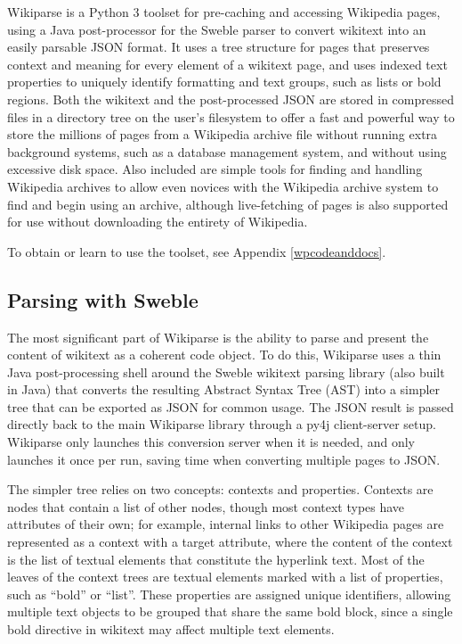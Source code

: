Wikiparse is a Python 3 toolset for pre-caching and accessing Wikipedia pages, using a Java post-processor for the Sweble\cite{sweble} parser to convert wikitext into an easily parsable JSON format. It uses a tree structure for pages that preserves context and meaning for every element of a wikitext page, and uses indexed text properties to uniquely identify formatting and text groups, such as lists or bold regions. Both the wikitext and the post-processed JSON are stored in compressed files in a directory tree on the user's filesystem to offer a fast and powerful way to store the millions of pages from a Wikipedia archive file without running extra background systems, such as a database management system, and without using excessive disk space. Also included are simple tools for finding and handling Wikipedia archives to allow even novices with the Wikipedia archive system to find and begin using an archive, although live-fetching of pages is also supported for use without downloading the entirety of Wikipedia.

To obtain or learn to use the toolset, see Appendix \ref{wpcodeanddocs}.

\subsection{Parsing with Sweble}

The most significant part of Wikiparse is the ability to parse and present the content of wikitext as a coherent code object. To do this, Wikiparse uses a thin Java post-processing shell around the Sweble\cite{sweble} wikitext parsing library (also built in Java) that converts the resulting Abstract Syntax Tree (AST) into a simpler tree that can be exported as JSON for common usage. The JSON result is passed directly back to the main Wikiparse library through a py4j client-server setup. Wikiparse only launches this conversion server when it is needed, and only launches it once per run, saving time when converting multiple pages to JSON.

The simpler tree relies on two concepts: contexts and properties. Contexts are nodes that contain a list of other nodes, though most context types have attributes of their own; for example, internal links to other Wikipedia pages are represented as a context with a target attribute, where the content of the context is the list of textual elements that constitute the hyperlink text. Most of the leaves of the context trees are textual elements marked with a list of properties, such as ``bold'' or ``list''. These properties are assigned unique identifiers, allowing multiple text objects to be grouped that share the same bold block, since a single bold directive in wikitext may affect multiple text elements.

